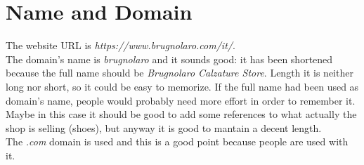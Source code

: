 \section{Name and Domain}
The website URL is \textit{https://www.brugnolaro.com/it/}.\\
The domain's name is \textit{brugnolaro} and it sounds good: it has been
shortened because the full name should be \textit{Brugnolaro Calzature
Store}. Length it is neither long nor short, so it could be easy to memorize.
If the full name had been used as domain's name, people would probably need
more effort in order to remember it. Maybe in this case it should be good to
add some references to what actually the shop is selling (shoes), but anyway
it is good to mantain a decent length.\\
The \textit{.com} domain is used and this is a good point because people are
used with it.
